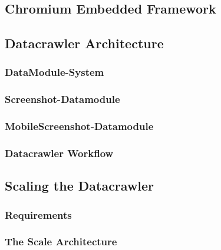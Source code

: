 \subsection{Chromium Embedded Framework}
\label{datacrawler_framework_language}

\subsection{Datacrawler Architecture}
\label{datacrawler_architecture}

\subsubsection{DataModule-System}
\label{datacrawler_datamodulesystem}

\subsubsection{Screenshot-Datamodule}
\label{datacrawler_screenshot_datamodule}

\subsubsection{MobileScreenshot-Datamodule}
\label{datacrawler_mobilescreenshot_datamodule}


\subsubsection{Datacrawler Workflow}
\label{datacrawler_workflow}

\subsection{Scaling the Datacrawler}
\label{datacrawler_scale}

\subsubsection{Requirements}
\label{datacrawler_scale_requirements}

\subsubsection{The Scale Architecture}
\label{datacrawler_scale_architecture}


